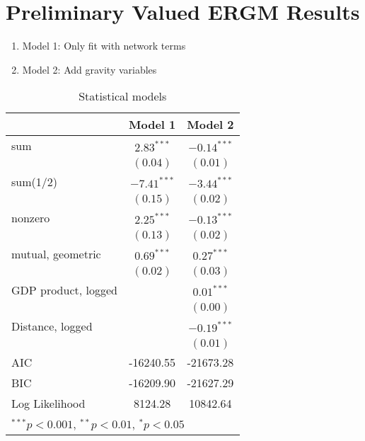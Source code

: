 \documentclass{article}
\begin{document}
\section{Preliminary Valued ERGM Results}

\begin{enumerate}
\item Model 1: Only fit with network terms
\item Model 2: Add gravity variables
	
\end{enumerate}



\begin{table}[!htb]
\begin{center}
\begin{tabular}{l c c }
\hline
 & Model 1 & Model 2 \\
\hline
sum                           & $2.83^{***}$  & $-0.14^{***}$ \\
                              & $(0.04)$      & $(0.01)$      \\
sum(1/2)                        & $-7.41^{***}$ & $-3.44^{***}$ \\
                              & $(0.15)$      & $(0.02)$      \\
nonzero                       & $2.25^{***}$  & $-0.13^{***}$ \\
                              & $(0.13)$      & $(0.02)$      \\
mutual, geometric              & $0.69^{***}$  & $0.27^{***}$  \\
                              & $(0.02)$      & $(0.03)$      \\
GDP product, logged     &               & $0.01^{***}$  \\
                              &               & $(0.00)$      \\
Distance, logged &               & $-0.19^{***}$ \\
                              &               & $(0.01)$      \\
\hline
AIC                           & -16240.55     & -21673.28     \\
BIC                           & -16209.90     & -21627.29     \\
Log Likelihood                & 8124.28       & 10842.64      \\
\hline
\multicolumn{3}{l}{\scriptsize{$^{***}p<0.001$, $^{**}p<0.01$, $^*p<0.05$}}
\end{tabular}
\caption{Statistical models}
\label{table:coefficients}
\end{center}
\end{table}
\doublespacing
\end{document}
